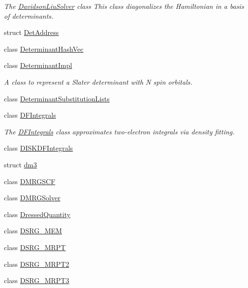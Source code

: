 \begin{DoxyCompactItemize}
\begin{DoxyCompactList}\small\item\em The \mbox{\hyperlink{classforte_1_1_davidson_liu_solver}{Davidson\+Liu\+Solver}} class This class diagonalizes the Hamiltonian in a basis of determinants. \end{DoxyCompactList}\item 
struct \mbox{\hyperlink{structforte_1_1_det_address}{Det\+Address}}
\item 
class \mbox{\hyperlink{classforte_1_1_determinant_hash_vec}{Determinant\+Hash\+Vec}}
\item 
class \mbox{\hyperlink{classforte_1_1_determinant_impl}{Determinant\+Impl}}
\begin{DoxyCompactList}\small\item\em A class to represent a Slater determinant with N spin orbitals. \end{DoxyCompactList}\item 
class \mbox{\hyperlink{classforte_1_1_determinant_substitution_lists}{Determinant\+Substitution\+Lists}}
\item 
class \mbox{\hyperlink{classforte_1_1_d_f_integrals}{D\+F\+Integrals}}
\begin{DoxyCompactList}\small\item\em The \mbox{\hyperlink{classforte_1_1_d_f_integrals}{D\+F\+Integrals}} class approximates two-\/electron integrals via density fitting. \end{DoxyCompactList}\item 
class \mbox{\hyperlink{classforte_1_1_d_i_s_k_d_f_integrals}{D\+I\+S\+K\+D\+F\+Integrals}}
\item 
struct \mbox{\hyperlink{structforte_1_1dm3}{dm3}}
\item 
class \mbox{\hyperlink{classforte_1_1_d_m_r_g_s_c_f}{D\+M\+R\+G\+S\+CF}}
\item 
class \mbox{\hyperlink{classforte_1_1_d_m_r_g_solver}{D\+M\+R\+G\+Solver}}
\item 
class \mbox{\hyperlink{classforte_1_1_dressed_quantity}{Dressed\+Quantity}}
\item 
class \mbox{\hyperlink{classforte_1_1_d_s_r_g___m_e_m}{D\+S\+R\+G\+\_\+\+M\+EM}}
\item 
class \mbox{\hyperlink{classforte_1_1_d_s_r_g___m_r_p_t}{D\+S\+R\+G\+\_\+\+M\+R\+PT}}
\item 
class \mbox{\hyperlink{classforte_1_1_d_s_r_g___m_r_p_t2}{D\+S\+R\+G\+\_\+\+M\+R\+P\+T2}}
\item 
class \mbox{\hyperlink{classforte_1_1_d_s_r_g___m_r_p_t3}{D\+S\+R\+G\+\_\+\+M\+R\+P\+T3}}

\end{DoxyCompactItemize}
